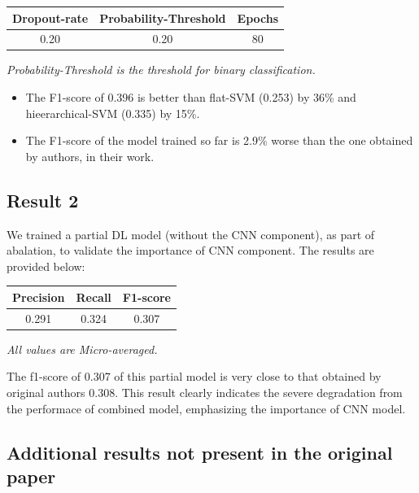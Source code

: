 \documentclass[11pt,a4paper]{article}
\begin{document}
\begin{small}
\begin{tabular}{ ccc }
  \hline
  	Dropout-rate & Probability-Threshold & Epochs \\
  \hline
  	0.20 & 0.20 & 80 \\
  \hline
\end{tabular}

\textit{Probability-Threshold is the threshold for binary classification.}
\end{small}
\newline

\begin{itemize}
	\item The F1-score of 0.396 is better than flat-SVM (0.253) by 36\% and hieerarchical-SVM (0.335) by 15\%.
	\item The F1-score of the model trained so far is 2.9\% worse than the one obtained by authors, in their work.
\end{itemize}

\subsection{Result 2}

We trained a partial DL model (without the CNN component), as part of abalation, to validate the importance of CNN component. The results are provided below:
\newline

\begin{small}
\begin{tabular}{ ccc }
  \hline
  	Precision & Recall & F1-score \\
  \hline
  	0.291 & 0.324 & 0.307 \\
  \hline
\end{tabular}

\textit{All values are Micro-averaged.}
\end{small}
\newline


The f1-score of 0.307 of this partial model is very close to that obtained by original authors 0.308. This result clearly indicates the severe degradation from the performace of combined model, emphasizing the importance of CNN model.

\subsection{Additional results not present in the original paper}
\end{document}

